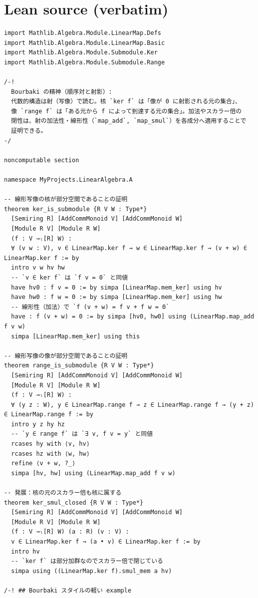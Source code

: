 \documentclass[12pt]{article}
\begin{document}
\section*{Lean source (verbatim)}
\begin{lstlisting}
import Mathlib.Algebra.Module.LinearMap.Defs
import Mathlib.Algebra.Module.LinearMap.Basic
import Mathlib.Algebra.Module.Submodule.Ker
import Mathlib.Algebra.Module.Submodule.Range

/-!
  Bourbaki の精神（順序対と射影）:
  代数的構造は射（写像）で読む。核 `ker f` は「像が 0 に射影される元の集合」、
  像 `range f` は「ある元から f によって到達する元の集合」。加法やスカラー倍の
  閉性は、射の加法性・線形性（`map_add`, `map_smul`）を各成分へ適用することで
  証明できる。
-/

noncomputable section

namespace MyProjects.LinearAlgebra.A

-- 線形写像の核が部分空間であることの証明
theorem ker_is_submodule {R V W : Type*}
  [Semiring R] [AddCommMonoid V] [AddCommMonoid W] 
  [Module R V] [Module R W]
  (f : V →ₗ[R] W) :
  ∀ (v w : V), v ∈ LinearMap.ker f → w ∈ LinearMap.ker f → (v + w) ∈ LinearMap.ker f := by
  intro v w hv hw
  -- `v ∈ ker f` は `f v = 0` と同値
  have hv0 : f v = 0 := by simpa [LinearMap.mem_ker] using hv
  have hw0 : f w = 0 := by simpa [LinearMap.mem_ker] using hw
  -- 線形性（加法）で `f (v + w) = f v + f w = 0`
  have : f (v + w) = 0 := by simpa [hv0, hw0] using (LinearMap.map_add f v w)
  simpa [LinearMap.mem_ker] using this

-- 線形写像の像が部分空間であることの証明  
theorem range_is_submodule {R V W : Type*}
  [Semiring R] [AddCommMonoid V] [AddCommMonoid W]
  [Module R V] [Module R W]
  (f : V →ₗ[R] W) :
  ∀ (y z : W), y ∈ LinearMap.range f → z ∈ LinearMap.range f → (y + z) ∈ LinearMap.range f := by
  intro y z hy hz
  -- `y ∈ range f` は `∃ v, f v = y` と同値
  rcases hy with ⟨v, hv⟩
  rcases hz with ⟨w, hw⟩
  refine ⟨v + w, ?_⟩
  simpa [hv, hw] using (LinearMap.map_add f v w)

-- 発展：核の元のスカラー倍も核に属する
theorem ker_smul_closed {R V W : Type*}
  [Semiring R] [AddCommMonoid V] [AddCommMonoid W]
  [Module R V] [Module R W]
  (f : V →ₗ[R] W) (a : R) (v : V) :
  v ∈ LinearMap.ker f → (a • v) ∈ LinearMap.ker f := by
  intro hv
  -- `ker f` は部分加群なのでスカラー倍で閉じている
  simpa using ((LinearMap.ker f).smul_mem a hv)

/-! ## Bourbaki スタイルの軽い example


\end{lstlisting}
\end{document}
